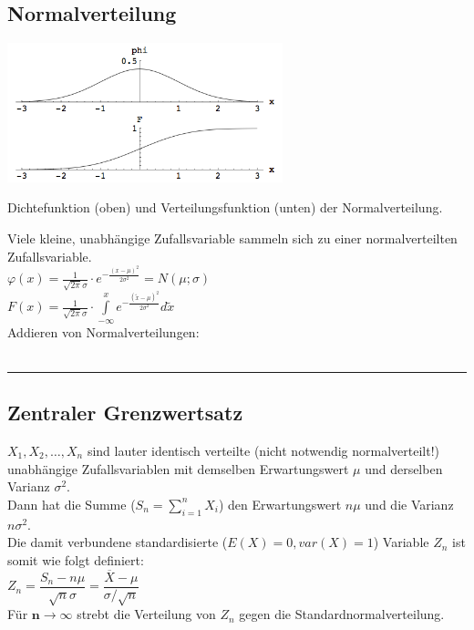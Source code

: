 \newpage

	\subsection{Normalverteilung }
    \begin{floatingfigure}[r]{8cm}
      \includegraphics[width=8cm]{./bilder/normalverteilung.png}
      \caption{Dichtefunktion (oben) und Verteilungsfunktion (unten) der
        Normalverteilung.}
   	\end{floatingfigure}
    
    Viele kleine, unabhängige Zufallsvariable sammeln sich zu einer
    normalverteilten Zufallsvariable.\\
    $\varphi(x)=\frac{1}{\sqrt{2
    \pi}\sigma}\cdot e^{-\frac{(x-\mu)^2}{2\sigma^2}} = N(\mu ; \sigma) $\\ 
    $F(x)=\frac{1}{\sqrt{2\pi}\sigma}\cdot \int\limits^{x}_{-\infty}{e^{-\frac{(\tilde{x} -\mu)^2}{2\sigma^2}}} d\tilde{x} $ \\
    Addieren von Normalverteilungen: \\
     \\
    
  \vspace{2cm}
	\hrule
  
	\subsection{Zentraler Grenzwertsatz }
      	$X_1, X_2, \ldots , X_n$ sind lauter identisch verteilte (nicht notwendig normalverteilt!)
      	unabhängige Zufallsvariablen mit demselben Erwartungswert $\mu$ und derselben Varianz $\sigma^2$.
      	\\ 
      	Dann hat die Summe ($S_n = \sum_{i=1}^n X_i$) den Erwartungswert $n \mu$ und die Varianz
      	$n \sigma^2$. \\
      	Die damit verbundene standardisierte ($E(X) = 0, var(X) = 1$) Variable $Z_n$ ist somit wie
      	folgt definiert: \\ $ Z_n = \dfrac{S_n - n \mu}{\sqrt{n} \sigma} = \dfrac{\overline{X} - \mu}{\sigma
      	/ \sqrt{n}}$
      	\\
      	Für $\boldsymbol{n \to \infty}$ strebt die Verteilung von $Z_n$ gegen die
      	Standardnormalverteilung. \\
        
